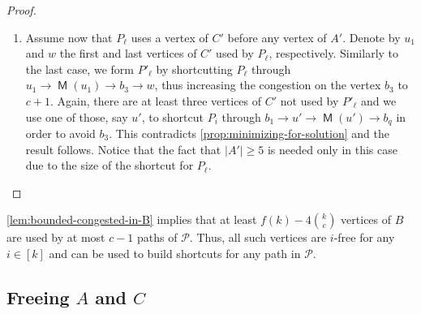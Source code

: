 \documentclass[a4paper,UKenglish,cleveref, autoref, thm-restate]{lipics-v2021}
\DeclareMathOperator{\Mat}{\mathsf M}
\begin{document}
\begin{proof}
\begin{enumerate}
\begin{figure}[h]
        \caption{Shortcuts built in the first case of the proof of
          \autoref{lem:bounded-congested-in-B}. The blue path starting in $v_1$ is the shortcut
          for $P_\ell$, forming $P'_\ell$. The red path starting in $b_1$ is the shortcut for
        $P_i$. The remaining arcs of $\mathcal{K}$ are omitted.}
        \label{fig:proof-of-bounded-in-B}
      \end{figure}
    
      \item Assume now that $P_\ell$ uses a vertex of $C'$ before any vertex of $A'$.
      Denote by $u_1$ and $w$ the first and last vertices of $C'$ used by $P_\ell$, respectively.
      Similarly to the last case, we form $P'_\ell$ by shortcutting $P_\ell$ through $u_1 \to
      \Mat(u_1) \to b_3 \to w$, thus increasing the congestion on the vertex $b_3$ to $c+1$.
      Again, there are at least three vertices of $C'$ not used by $P'_\ell$ and we use one
      of those, say $u'$, to shortcut $P_i$ through $b_1 \to u' \to \Mat(u') \to b_q$ in
      order to avoid $b_3$. This contradicts \autoref{prop:minimizing-for-solution} and the
      result follows.
      Notice that the fact that $|A'| \geq 5$ is needed only in this case due to the size of the shortcut
      for $P_\ell$.
    \end{enumerate}
    \vspace{-\baselineskip}
\end{proof}

\autoref{lem:bounded-congested-in-B} implies that at least $f(k) - 4\binom{k}{c}$
vertices of $B$ are used by at most $c-1$ paths of $\mathcal{P}$.
Thus, all such vertices are $i$-free for any $i \in [k]$ and can be used to build
shortcuts for any path in $\mathcal{P}$.

\subsection{Freeing $A$ and $C$}
\label{sec:free_ac}
\end{document}
